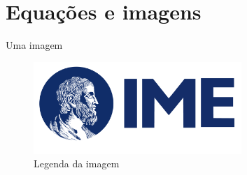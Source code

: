 \section{Equações e imagens} %


\begin{frame}{Uma imagem}
   \begin{figure}[h]
       \centering
       \includegraphics[width=0.7\textwidth]{img/logo_IME.png}
       \caption{Legenda da imagem}
       \label{fig:label_da_imagem}
   \end{figure}
\end{frame}


